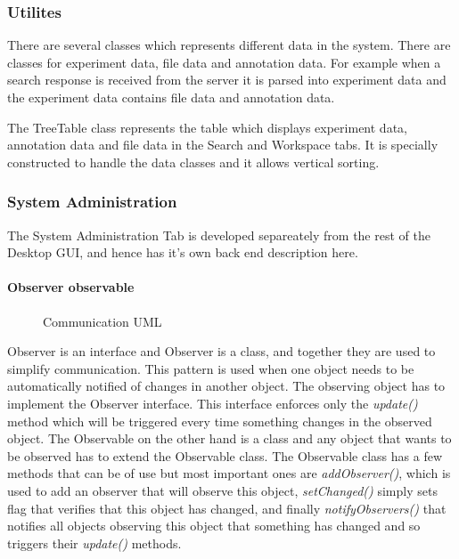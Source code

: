 \subsubsection{Utilites}

There are several classes which represents different data in the system. There are classes for experiment data, file data and annotation data. For example when a search response is received from the server it is parsed into experiment data and the experiment data contains file data and annotation data.

The TreeTable class represents the table which displays experiment data, annotation data and file data in the Search and Workspace tabs. It is specially constructed to handle the data classes and it allows vertical sorting.

\subsubsection{System Administration}
The System Administration Tab is developed separeately from the rest of the Desktop GUI, and hence has it's own back end description here. 

\paragraph{Observer observable}
\label{Observer observable}

\begin{figure}[htb!]
\caption{Communication UML}
\label{fig:adm_viewmodelcomuml}
\end{figure}

Observer is an interface and Observer is a class, and together they are used to simplify communication. This pattern is used when one object needs to be automatically notified of changes in another object. The observing object has to implement the Observer interface. This interface enforces only the \textit{update()} method which will be triggered every time something changes in the observed object. The Observable on the other hand is a class and any object that wants to be observed has to extend the Observable class. The Observable class has a few methods that can be of use but most important ones are \textit{addObserver()}, which is used to add an observer that will observe this object, \textit{setChanged()} simply sets flag that verifies that this object has changed, and finally \textit{notifyObservers()} that notifies all objects observing this object that something has changed and so triggers their \textit{update()} methods.

